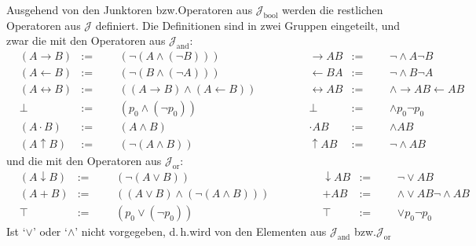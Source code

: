\documentclass[english,ngerman,parskip=half,headsepline,footsepline,
	fleqn,notitlepage]{scrreprt}
\makeatletter
\newcommand*{\defeq}{:=}%
\newcommand*{\ladd}{+}
\newcommand*{\lmult}{\cdot}
\newcommand*{\ltrue}{\top}%
\newcommand*{\lfalse}{\bot}%
\newcommand*{\lrep}{\leftarrow}%
\newcommand*{\limp}{\rightarrow}%
\newcommand*{\lequiv}{\leftrightarrow}%
\newcommand*{\lnand}{\uparrow}%
\newcommand*{\lnor}{\downarrow}%
\newcommand*{\asJ}{\mathcal{J}}%
\newcommand*{\xAnd}{\mathrm{and}}%
\newcommand*{\xBool}{\mathrm{bool}}%
\newcommand*{\xOr}{\mathrm{or}}%
\newcommand*{\formulatoleft}{&&&&&&&&&&}%
\newcommand*{\formulaspace}{&&&&}%
\newcommand*{\charqt}[1]{\enquote*{#1}}%
\newcommand*{\symqt}[1]{\charqt{#1}}%
\newcommand*{\textbzw}{bzw.\@ }
\newcommand*{\textdh}{d.\@\,h.\@ }
\makeatother
\begin{document}
	Ausgehend von den Junktoren \textbzw Operatoren aus $\asJ_\xBool$
	werden die restlichen Operatoren aus $\asJ$ definiert.
	Die Definitionen sind in zwei Gruppen eingeteilt,
	und zwar die mit den Operatoren aus $\asJ_\xAnd$:
	\begin{align}
		&                (A \limp B)  &\defeq & & & (\lnot (A \land (\lnot B)))
		& \formulaspace &   \limp A B &\defeq & & & \lnot \land A \lnot B
		\label{def:imp}
		\\
		&                (A \lrep B)  &\defeq & & & (\lnot (B \land (\lnot A)))
		& \formulaspace &   \lrep B A &\defeq & & & \lnot \land B \lnot A
		\label{def:rep}
		\\
		&              (A \lequiv B)  &\defeq & & & ((A\limp B)\land(A\lrep B))
		& \formulaspace & \lequiv A B &\defeq & & & \land \limp A B \lrep A B
		\label{def:equiv}
		\\
		&                     \lfalse & \defeq & & & (p_0 \land (\lnot p_0))
		& \formulaspace &     \lfalse & \defeq & & & \land p_0 \lnot p_0
		\label{def:false}
		\\
		&               (A \lmult B)  & \defeq & & & (A \land B)
		& \formulaspace &  \lmult A B & \defeq & & & \land A B
		\label{def:mult}
		\\
		&               (A \lnand B)  &\defeq & & & (\lnot (A \land B ))
		& \formulaspace &  \lnand A B &\defeq & & & \lnot \land A B
		\label{def:nand}
		\formulatoleft
	\end{align}
	und die mit den Operatoren  aus $\asJ_\xOr$:
	\begin{align}
		&                (A \lnor B)  & \defeq & & & (\lnot (A \lor B))
		& \formulaspace &   \lnor A B & \defeq & & & \lnot \lor A B
		\label{def:nor}
		\\
		& (A \ladd B) & \defeq & & & ((A\lor B)\land(\lnot(A\land B)))
		& \formulaspace &   \ladd A B & \defeq & & & \land\lor A B\lnot\land A B
		\label{def:add}
		\\
		&                      \ltrue & \defeq & & & (p_0 \lor (\lnot p_0))
		& \formulaspace &      \ltrue & \defeq & & & \lor p_0 \lnot p_0
		\label{def:true}
		\formulatoleft
	\end{align}
	Ist \symqt{$\lor$} oder \symqt{$\land$} nicht vorgegeben,
	\textdh wird von den Elementen aus $\asJ_\xAnd$ \textbzw $\asJ_\xOr$
\end{document}
